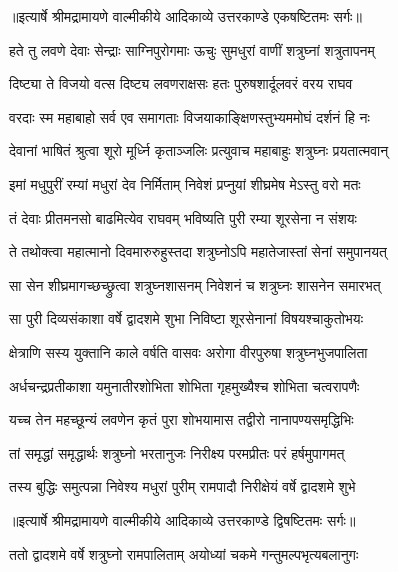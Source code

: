{॥इत्यार्षे श्रीमद्रामायणे वाल्मीकीये आदिकाव्ये उत्तरकाण्डे एकषष्टितमः सर्गः॥}


\twolineshloka
{हते तु लवणे देवाः सेन्द्राः साग्निपुरोगमाः}
{ऊचुः सुमधुरां वाणीं शत्रुघ्नां शत्रुतापनम्} %

\twolineshloka
{दिष्ट्या ते विजयो वत्स दिष्ट्य लवणराक्षसः}
{हतः पुरुषशार्दूलवरं वरय राघव} %

\twolineshloka
{वरदाः स्म महाबाहो सर्व एव समागताः}
{विजयाकाङ्क्षिणस्तुभ्यममोघं दर्शनं हि नः} %

\twolineshloka
{देवानां भाषितं श्रुत्वा शूरो मूर्ध्नि कृताञ्जलिः}
{प्रत्युवाच महाबाहुः शत्रुघ्नः प्रयतात्मवान्} %

\twolineshloka
{इमां मधुपुरीं रम्यां मधुरां देव निर्मिताम्}
{निवेशं प्रप्नुयां शीघ्रमेष मेऽस्तु वरो मतः} %

\twolineshloka
{तं देवाः प्रीतमनसो बाढमित्येव राघवम्}
{भविष्यति पुरी रम्या शूरसेना न संशयः} %

\twolineshloka
{ते तथोक्त्वा महात्मानो दिवमारुरुहुस्तदा}
{शत्रुघ्नोऽपि महातेजास्तां सेनां समुपानयत्} %

\twolineshloka
{सा सेन शीघ्रमागच्छच्छ्रुत्वा शत्रुघ्नशासनम्}
{निवेशनं च शत्रुघ्नः शासनेन समारभत्} %

\twolineshloka
{सा पुरी दिव्यसंकाशा वर्षे द्वादशमे शुभा}
{निविष्टा शूरसेनानां विषयश्चाकुतोभयः} %

\twolineshloka
{क्षेत्राणि सस्य युक्तानि काले वर्षति वासवः}
{अरोगा वीरपुरुषा शत्रुघ्नभुजपालिता} %

\twolineshloka
{अर्धचन्द्रप्रतीकाशा यमुनातीरशोभिता}
{शोभिता गृहमुख्यैश्च शोभिता चत्वरापणैः} %

\twolineshloka
{यच्च तेन महच्छून्यं लवणेन कृतं पुरा}
{शोभयामास तद्वीरो नानापण्यसमृद्धिभिः} %

\twolineshloka
{तां समृद्धां समृद्धार्थः शत्रुघ्नो भरतानुजः}
{निरीक्ष्य परमप्रीतः परं हर्षमुपागमत्} %

\twolineshloka
{तस्य बुद्धिः समुत्पन्ना निवेश्य मधुरां पुरीम्}
{रामपादौ निरीक्षेयं वर्षे द्वादशमे शुभे} %


{॥इत्यार्षे श्रीमद्रामायणे वाल्मीकीये आदिकाव्ये उत्तरकाण्डे द्विषष्टितमः सर्गः॥}


\twolineshloka
{ततो द्वादशमे वर्षे शत्रुघ्नो रामपालिताम्}
{अयोध्यां चकमे गन्तुमल्पभृत्यबलानुगः} %

